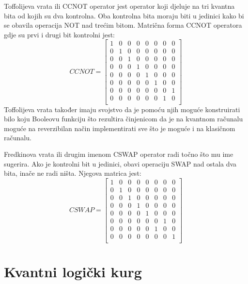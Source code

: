 Toffolijeva vrata ili CCNOT operator jest operator koji djeluje na tri kvantna bita od kojih su dva kontrolna. Oba kontrolna bita moraju biti u jedinici kako bi se obavila operacija NOT nad trećim bitom. Matrična forma CCNOT operatora gdje su prvi i drugi bit kontrolni jest:
\begin{equation}
\textit{CCNOT}= \begin{bmatrix}
1 & 0 & 0 & 0 & 0 & 0 & 0 & 0 \\
0 & 1 & 0 & 0 & 0 & 0 & 0 & 0 \\
0 & 0 & 1 & 0 & 0 & 0 & 0 & 0 \\
0 & 0 & 0 & 1 & 0 & 0 & 0 & 0 \\
0 & 0 & 0 & 0 & 1 & 0 & 0 & 0 \\
0 & 0 & 0 & 0 & 0 & 1 & 0 & 0 \\
0 & 0 & 0 & 0 & 0 & 0 & 0 & 1 \\
0 & 0 & 0 & 0 & 0 & 0 & 1 & 0 \\
\end{bmatrix}
\end{equation}
Toffolijeva vrata također imaju svojstvo da je pomoću njih moguće konstruirati bilo koju Booleovu funkciju što rezultira činjenicom da je na kvantnom računalu moguće na reverzibilan način implementirati sve što je moguće i na klasičnom računalu.

Fredkinova vrata ili drugim imenom CSWAP operator radi točno što mu ime sugerira. Ako je kontrolni bit u jedinici, obavi operaciju SWAP nad ostala dva bita, inače ne radi ništa. Njegova matrica jest:
\begin{equation}
\textit{CSWAP} = \begin{bmatrix}
1 & 0 & 0 & 0 & 0 & 0 & 0 & 0 \\
0 & 1 & 0 & 0 & 0 & 0 & 0 & 0 \\
0 & 0 & 1 & 0 & 0 & 0 & 0 & 0 \\
0 & 0 & 0 & 1 & 0 & 0 & 0 & 0 \\
0 & 0 & 0 & 0 & 1 & 0 & 0 & 0 \\
0 & 0 & 0 & 0 & 0 & 0 & 1 & 0 \\
0 & 0 & 0 & 0 & 0 & 1 & 0 & 0 \\
0 & 0 & 0 & 0 & 0 & 0 & 0 & 1 \\
\end{bmatrix}
\end{equation}

\section{Kvantni logički kurg}

